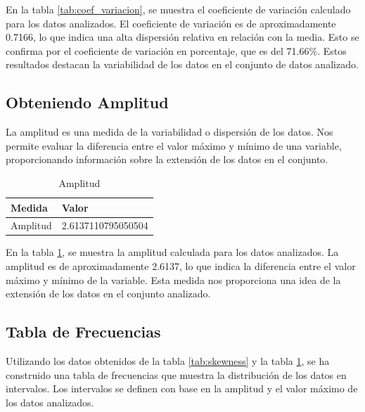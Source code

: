 En la tabla \ref{tab:coef_variacion}, se muestra el coeficiente de variación
calculado para los datos analizados. El coeficiente de variación es de
aproximadamente 0.7166, lo que indica una alta dispersión relativa en relación
con la media. Esto se confirma por el coeficiente de variación en porcentaje,
que es del 71.66\%. Estos resultados destacan la variabilidad de los datos en
el conjunto de datos analizado.

\subsection{Obteniendo Amplitud}

La amplitud es una medida de la variabilidad o dispersión de los datos. Nos
permite evaluar la diferencia entre el valor máximo y mínimo de una variable,
proporcionando información sobre la extensión de los datos en el conjunto.

\begin{table}[htbp]
    \centering
    \caption{Amplitud}
    \begin{tabular}{ll}
        \hline
        \textbf{Medida} & \textbf{Valor}     \\
        \hline
        Amplitud        & 2.6137110795050504 \\
        \hline
    \end{tabular}
    \label{tab:amplitud}
\end{table}

En la tabla \ref{tab:amplitud}, se muestra la amplitud calculada para los datos
analizados. La amplitud es de aproximadamente 2.6137, lo que indica la
diferencia entre el valor máximo y mínimo de la variable. Esta medida nos
proporciona una idea de la extensión de los datos en el conjunto analizado.

\subsection{Tabla de Frecuencias}

Utilizando los datos obtenidos de la tabla \ref{tab:skewness} y la tabla
\ref{tab:amplitud}, se ha construido una tabla de frecuencias que muestra la
distribución de los datos en intervalos. Los intervalos se definen con base en
la amplitud y el valor máximo de los datos analizados.

